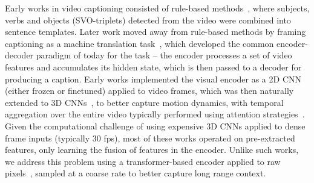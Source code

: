 \documentclass[10pt,twocolumn,letterpaper]{article}
\begin{document}
 Early works in video captioning consisted of rule-based methods~\cite{kojima2002natural,das2013thousand}, where subjects, verbs and objects (SVO-triplets) detected from the video were combined into sentence templates. Later work moved away from rule-based methods by framing captioning as a machine translation task~\cite{rohrbach2013translating,sutskever2014sequence,bahdanau2015neural}, which developed the common encoder-decoder paradigm of today for the task -- the encoder processes a set of video features and accumulates its hidden state, which is then passed to a decoder for
producing a caption.
Early works implemented the visual encoder as a 2D CNN (either frozen or finetuned) applied to video frames, which was then naturally extended to 3D CNNs~\cite{carreira2017quo,xie2018rethinking}, to better capture motion dynamics, with temporal aggregation over the entire video typically performed using attention strategies~\cite{chen2019motion}. Given the computational challenge of using expensive 3D CNNs applied to dense frame inputs (typically 30 fps), most of these works operated on pre-extracted features, only learning the fusion of features in the encoder. Unlike such works, we address this problem using a transformer-based encoder applied to raw pixels~\cite{arnab2021vivit}, sampled at a coarse rate to better capture long range context. 
\end{document}
